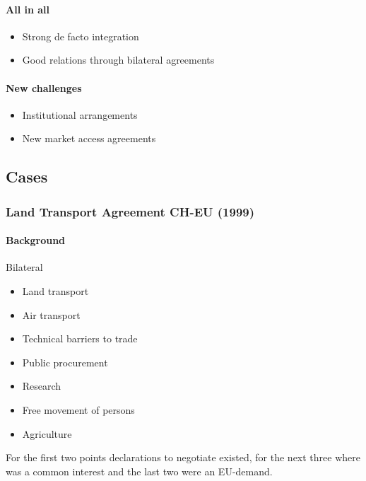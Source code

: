 \paragraph{All in all}

\begin{itemize}
    \item Strong de facto integration
    \item Good relations through bilateral agreements
\end{itemize}

\paragraph{New challenges}

\begin{itemize}
    \item Institutional arrangements
    \item New market access agreements
\end{itemize}

\subsection{Cases}

\subsubsection{Land Transport Agreement CH-EU (1999)}

\paragraph{Background}

Bilateral 
\begin{itemize}
    \item Land transport
    \item Air transport
    \item Technical barriers to trade
    \item Public procurement
    \item Research
    \item Free movement of persons
    \item Agriculture
\end{itemize}

For the first two points declarations to negotiate existed, for the next
three where was a common interest and the last two were an EU-demand.

